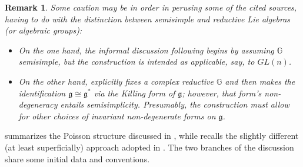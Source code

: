 \documentclass[11pt,leqno]{article}
\theoremstyle{plain}
\theoremstyle{plain}
\theoremstyle{plain}
\newtheorem{remark}[lemma]{Remark}
\numberwithin{equation}{section}
\theoremstyle{nonumberplain}
\newcommand\bG{{\mathbb G}}
\newcommand\fg{{\mathfrak g}}
\newcommand\1{{\bf 1}}
\begin{document}
\begin{remark}\label{re:rdctv.vs.ss}
  Some caution may be in order in perusing some of the cited sources, having to do with the distinction between semisimple and reductive Lie algebras (or algebraic groups):
  \begin{itemize}[wide]
  \item On the one hand, the informal discussion following \cite[Theorem 1]{FO98} begins by assuming $\bG$ semisimple, but the construction is intended as applicable, say, to $GL(n)$. 

  \item On the other hand, \cite[\S 2]{MR2396472} explicitly fixes a complex reductive $\bG$ and \cite[\S 3]{MR2396472} then makes the identification $\fg\cong \fg^*$ via the \emph{Killing form} of $\fg$; however, that form's non-degeneracy entails \cite[\S 5.1, Theorem]{hmph_1972} semisimplicity. Presumably, the construction must allow for other choices of invariant non-degenerate forms on $\fg$.
  \end{itemize}
\end{remark}

 summarizes the Poisson structure discussed in \cite[\S 3.1]{MR2396472}, while  recalls the slightly different (at least superficially) approach adopted in \cite[post Theorem 1, p.67]{FO98}. The two branches of the discussion share some initial data and conventions.
\end{document}
